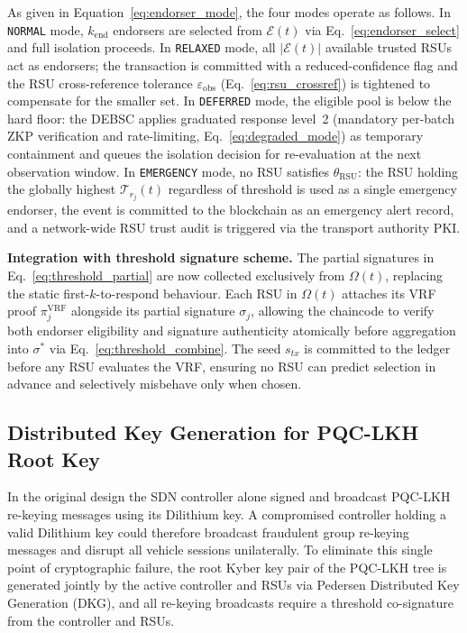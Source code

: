 \documentclass[12pt, a4paper]{report}
\newcommand{\mypar}{\vspace{0.8em}\noindent}
\begin{document}
As given in Equation~\eqref{eq:endorser_mode}, the four modes
operate as follows. In \texttt{NORMAL} mode, $k_{\text{end}}$
endorsers are selected from $\mathcal{E}(t)$ via
Eq.~\eqref{eq:endorser_select} and full isolation proceeds.
In \texttt{RELAXED} mode, all $|\mathcal{E}(t)|$ available
trusted RSUs act as endorsers; the transaction is committed
with a reduced-confidence flag and the RSU cross-reference
tolerance $\varepsilon_{\text{obs}}$ (Eq.~\eqref{eq:rsu_crossref})
is tightened to compensate for the smaller set. In
\texttt{DEFERRED} mode, the eligible pool is below the hard
floor: the DEBSC applies graduated response level~2 (mandatory
per-batch ZKP verification and rate-limiting,
Eq.~\eqref{eq:degraded_mode}) as temporary containment and
queues the isolation decision for re-evaluation at the next
observation window. In \texttt{EMERGENCY} mode, no RSU
satisfies $\theta_{\text{RSU}}$: the RSU holding the globally
highest $\mathcal{T}_{r_j}(t)$ regardless of threshold is
used as a single emergency endorser, the event is committed
to the blockchain as an emergency alert record, and a
network-wide RSU trust audit is triggered via the transport
authority PKI.

\mypar
\textbf{Integration with threshold signature scheme.}
The partial signatures in Eq.~\eqref{eq:threshold_partial} are
now collected exclusively from $\Omega(t)$, replacing the
static first-$k$-to-respond behaviour. Each RSU in $\Omega(t)$
attaches its VRF proof $\pi_j^{\text{VRF}}$ alongside its
partial signature $\sigma_j$, allowing the chaincode to verify
both endorser eligibility and signature authenticity atomically
before aggregation into $\sigma^*$ via
Eq.~\eqref{eq:threshold_combine}. The seed $s_{tx}$ is
committed to the ledger before any RSU evaluates the VRF,
ensuring no RSU can predict selection in advance and
selectively misbehave only when chosen.

\subsection{Distributed Key Generation for PQC-LKH Root Key}
\label{sec:dkg}

In the original design the SDN controller alone signed and broadcast
PQC-LKH re-keying messages using its Dilithium key. A compromised
controller holding a valid Dilithium key could therefore broadcast
fraudulent group re-keying messages and disrupt all vehicle sessions
unilaterally. To eliminate this single point of cryptographic
failure, the root Kyber key pair of the PQC-LKH tree is generated
jointly by the active controller and RSUs via Pedersen Distributed
Key Generation (DKG), and all re-keying broadcasts require a
threshold co-signature from the controller and RSUs.
\end{document}
